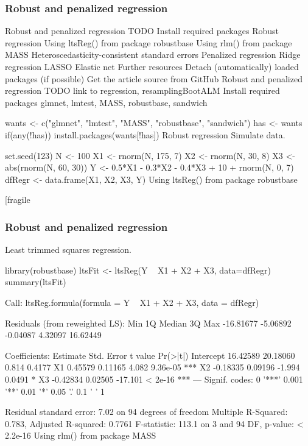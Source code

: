\begin{frame}
\frametitle{Robust and penalized regression}
\large


Robust and penalized regression
TODO
Install required packages
Robust regression
Using ltsReg() from package robustbase
Using rlm() from package MASS
Heteroscedasticity-consistent standard errors
Penalized regression
Ridge regression
LASSO
Elastic net
Further resources
Detach (automatically) loaded packages (if possible)
Get the article source from GitHub
Robust and penalized regression
TODO
link to regression, resamplingBootALM
Install required packages
glmnet, lmtest, MASS, robustbase, sandwich

wants <- c("glmnet", "lmtest", "MASS", "robustbase", "sandwich")
has   <- wants %
if(any(!has)) install.packages(wants[!has])
Robust regression
Simulate data.

set.seed(123)
N  <- 100
X1 <- rnorm(N, 175, 7)
X2 <- rnorm(N,  30, 8)
X3 <- abs(rnorm(N, 60, 30))
Y  <- 0.5*X1 - 0.3*X2 - 0.4*X3 + 10 + rnorm(N, 0, 7)
dfRegr <- data.frame(X1, X2, X3, Y)
Using ltsReg() from package robustbase
\end{frame}
\begin{frame}[fragile
\frametitle{Robust and penalized regression}
\large

Least trimmed squares regression.

library(robustbase)
ltsFit <- ltsReg(Y ~ X1 + X2 + X3, data=dfRegr)
summary(ltsFit)

Call:
ltsReg.formula(formula = Y ~ X1 + X2 + X3, data = dfRegr)

Residuals (from reweighted LS):
      Min        1Q    Median        3Q       Max 
-16.81677  -5.06892  -0.04087   4.32097  16.62449 

Coefficients:
          Estimate Std. Error t value Pr(>|t|)    
Intercept 16.42589   20.18060   0.814   0.4177    
X1         0.45579    0.11165   4.082 9.36e-05 ***
X2        -0.18335    0.09196  -1.994   0.0491 *  
X3        -0.42834    0.02505 -17.101  < 2e-16 ***
---
Signif. codes:  0 '***' 0.001 '**' 0.01 '*' 0.05 '.' 0.1 ' ' 1

Residual standard error: 7.02 on 94 degrees of freedom
Multiple R-Squared: 0.783,  Adjusted R-squared: 0.7761 
F-statistic: 113.1 on 3 and 94 DF,  p-value: < 2.2e-16 
Using rlm() from package MASS
\end{frame}

